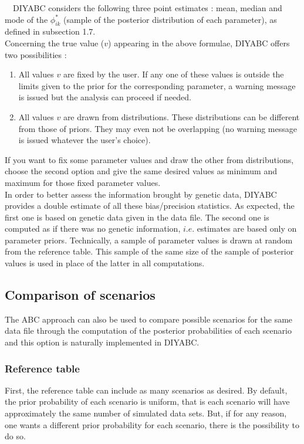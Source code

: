 ~\
DIYABC considers the following three point estimates : mean, median and mode of the  $\phi_{ik}^*$  (sample of the posterior distribution of each parameter), as defined in subsection 1.7.
~\\
 Concerning the true value ($v$) appearing in the above formulae, DIYABC offers two possibilities :
 \begin{enumerate}
 \item All values $v$ are fixed by the user. If any one of these values is outside the limits given to the prior for the corresponding parameter, a warning message is issued but the analysis can proceed if needed.
 \item All values $v$ are drawn from distributions. These distributions can be different from those of priors. They may even not be overlapping (no warning message is issued whatever the user's choice). 
 \end{enumerate}
 If you want to fix some parameter values and draw the other from distributions, choose the second option and give the same desired values as minimum and maximum for those fixed parameter values.\\

In order to better assess the information brought by genetic data, DIYABC provides a double estimate of all these bias/precision statistics. As expected, the first one is based on genetic data given in the data file. The second one is computed as if there was no genetic information, $i.e.$ estimates are based only on parameter priors. Technically, a sample of parameter values is drawn at random from the reference table. This sample of the same size of the sample of posterior values is used in place of the latter in all computations.

\subsection{Comparison of scenarios}
The ABC approach can also be used to compare possible scenarios for the same data file through the computation of the posterior probabilities of each scenario and this option is naturally implemented in DIYABC.\\

\subsubsection{Reference table} 
First, the reference table can include as many scenarios as desired. By default, the prior probability of each scenario is uniform, that is each scenario will have approximately the same number of simulated data sets. But, if for any reason, one wants a different prior probability for each scenario, there is the possibility to do so.\\


